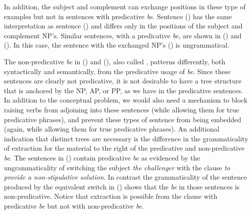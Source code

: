 


In addition, the subject and complement can exchange positions in these type of
examples but not in sentences with predicative {\it be}.  Sentence ({})
has the same interpretation as sentence ({}) and differs only in the
positions of the subject and complement NP's. Similar sentences, with a
predicative {\it be}, are shown in ({}) and ({}).  In this case,
the sentence with the exchanged NP's ({}) is ungrammatical.


The non-predicative {\it be} in ({}) and ({}), also called
, patterns differently, both syntactically and
semantically, from the predicative usage of {\it be}.  Since these sentences
are clearly not predicative, it is not desirable to have a tree structure that
is anchored by the NP, AP, or PP, as we have in the predicative sentences.  In
addition to the conceptual problem, we would also need a mechanism to block
raising verbs from adjoining into these sentences (while allowing them for true
predicative phrases), and prevent these types of sentence from being embedded
(again, while allowing them for true predicative phrases).  An additional
indication that distinct trees are necessary is the difference in the
grammaticality of extraction for the material to the right of the predicative
and non-predicative {\it be}.  The sentences in ({}) contain predicative
{\it be} as evidenced by the ungrammaticality of switching the subject {\it the
challenger} with the clause {\it to provide a non-stipulative solution}. In
contrast the grammaticality of the sentence produced by the equivalent switch
in ({}) shows that the {\it be} in those sentences is
non-predicative. Notice that extraction is possible from the clause with
predicative {\it be} but not with non-predicative {\it be}.


